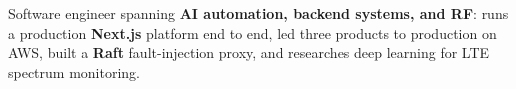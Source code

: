 Software engineer spanning \textbf{AI automation, backend systems, and RF}: runs a production \textbf{Next.js} platform end to end, led three products to production on AWS, built a \textbf{Raft} fault-injection proxy, and researches deep learning for LTE spectrum monitoring.
